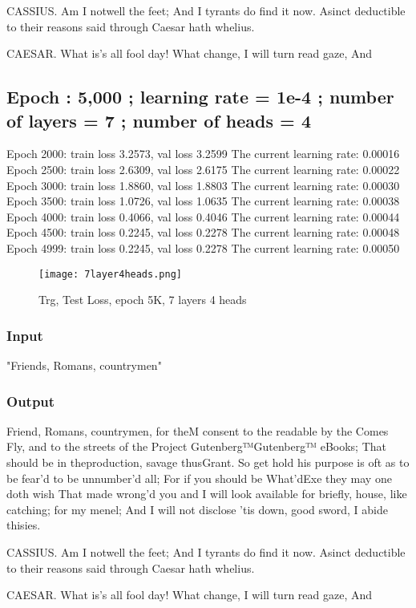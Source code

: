 \documentclass[conference]{IEEEtran}
\begin{document}
CASSIUS.
Am I notwell the feet;
And I tyrants do find it now.
Asinct deductible to their reasons said through Caesar hath whelius.

CAESAR.
What is’s all fool day!
What change, I will turn read gaze,
And

\subsection{Epoch : 5,000 ; learning rate = 1e-4 ; number of layers = 7 ; number of heads = 4}
Epoch 2000: train loss 3.2573, val loss 3.2599
The current learning rate: 0.00016
Epoch 2500: train loss 2.6309, val loss 2.6175
The current learning rate: 0.00022
Epoch 3000: train loss 1.8860, val loss 1.8803
The current learning rate: 0.00030
Epoch 3500: train loss 1.0726, val loss 1.0635
The current learning rate: 0.00038
Epoch 4000: train loss 0.4066, val loss 0.4046
The current learning rate: 0.00044
Epoch 4500: train loss 0.2245, val loss 0.2278
The current learning rate: 0.00048
Epoch 4999: train loss 0.2245, val loss 0.2278
The current learning rate: 0.00050
\begin{figure}[H]
    \centering
    \texttt{[image: 7layer4heads.png]}
    \caption{Trg, Test Loss, epoch 5K, 7 layers 4 heads}
    \label{fig:epoch}
\end{figure}
\subsubsection{Input}
"Friends, Romans, countrymen"
\subsubsection{Output}
Friend, Romans, countrymen, for theM consent to the readable by the Comes
Fly, and to the streets of the Project Gutenberg™Gutenberg™ eBooks;
That should be in theproduction, savage thusGrant.
So get hold his purpose is oft as to be fear’d to be unnumber’d all;
For if you should be What’dExe
 they may one doth wish
That made wrong’d you and I will look available for briefly,
house, like catching; for my menel;
And I will not disclose ’tis down, good sword,
I abide thisies.

CASSIUS.
Am I notwell the feet;
And I tyrants do find it now.
Asinct deductible to their reasons said through Caesar hath whelius.

CAESAR.
What is’s all fool day!
What change, I will turn read gaze,
And
\end{document}
